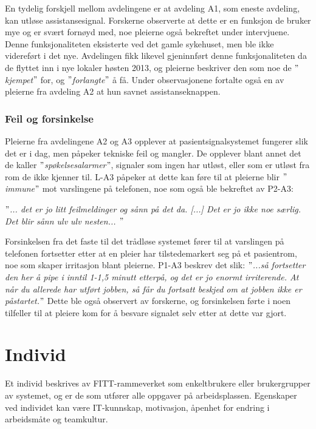 \noindent
En tydelig forskjell mellom avdelingene er at avdeling A1, som eneste avdeling, kan utløse assistansesignal. Forskerne observerte at dette er en funksjon de bruker mye og er svært fornøyd med, noe pleierne også bekreftet under intervjuene. Denne funksjonaliteten eksisterte ved det gamle sykehuset, men ble ikke videreført i det nye. Avdelingen fikk likevel gjeninnført denne funksjonaliteten da de flyttet inn i nye lokaler høsten 2013, og pleierne beskriver den som noe de \textit{$"$kjempet$"$} for, og \textit{$"$forlangte$"$} å få. Under observasjonene fortalte også en av pleierne fra avdeling A2 at hun savnet assistanseknappen. 

\subsubsection{Feil og forsinkelse}
Pleierne fra avdelingene A2 og A3 opplever at pasientsignalsystemet fungerer slik det er i dag, men påpeker tekniske feil og mangler. De opplever blant annet det de kaller \textit{$"$spøkelsesalarmer$"$}, signaler som ingen har utløst, eller som er utløst fra rom de ikke kjenner til. L-A3 påpeker at dette kan føre til at pleierne blir \textit{$"$immune$"$} mot varslingene på telefonen, noe som også ble bekreftet av P2-A3:

\noindent
\textit{$"$... det er jo litt feilmeldinger og sånn på det da. [...] Det er jo ikke noe særlig. Det blir sånn ulv ulv nesten... $"$}

\noindent 
Forsinkelsen fra det faste til det trådløse systemet fører til at varslingen på telefonen fortsetter etter at en pleier har tilstedemarkert seg på et pasientrom, noe som skaper irritasjon blant pleierne. P1-A3 beskrev det slik: \textit{$"$...så fortsetter den her å pipe i inntil 1-1,5 minutt etterpå, og det er jo enormt irriterende. At når du allerede har utført jobben, så får du fortsatt beskjed om at jobben ikke er påstartet.$"$} Dette ble også observert av forskerne, og forsinkelsen førte i noen tilfeller til at pleiere kom for å besvare signalet selv etter at dette var gjort. 

\section{Individ}
Et individ beskrives av FITT-rammeverket som enkeltbrukere eller brukergrupper av systemet, og er de som utfører alle oppgaver på arbeidsplassen. Egenskaper ved individet kan være IT-kunnskap, motivasjon, åpenhet for endring i arbeidsmåte og teamkultur.

